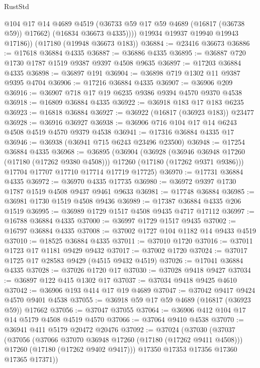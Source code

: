 \begin{lexlean}{RustStd}
\begin{coremodule}
              @104
              @17
              @14
              @4689
              @4519
              (@36733 @59 @17 @59 @4689 (@16817 (@36738 @59)) @17662)
              (@16834 @36673 @4335))))
        @19934
        @19937
        @19940
        @19943
        @17186))
    (@17180 (@19948 @36673 @183))
@36884 := @23416 @36673
@36886 := @17618 @36884 @4335
@36887 := @36886 @4335
@36895 := @36887 @720 @1730 @1787 @1519 @9387 @9397 @4508 @9635
@36897 := @17203 @36884 @4335
@36898 := @36897 @191
@36904 := @36898 @719 @1302 @11 @9387 @9395 @4704
@36906 := @17216 @36884 @4335
@36907 := @36906 @209
@36916 := @36907 @718 @17 @19 @6235 @9386 @9394 @4570 @9370 @4538
@36918 := @16809 @36884 @4335
@36922 := @36918 @183 @17 @183 @6235
@36923 := @16818 @36884
@36927 := @36922 (@16817 (@36923 @183)) @23477
@36928 := @36916 @36927
@36938 := @36906 @716 @104 @17 @14 @6243 @4508 @4519 @4570 @9379 @4538
@36941 := @17316 @36884 @4335 @17
@36946 := @36938 (@36941 @715 @6243 @23496 @23500)
@36948 := @17254 @36884 @4335
@36968 := @36895
    (@36904
      (@36928
        (@36946 @36948 @17260 (@17180 (@17262 @9380 @4508)))
        @17260
        (@17180 (@17262 @9371 @9386)))
      @17704
      @17707
      @17710
      @17714
      @17719
      @17725)
@36970 := @17731 @36884 @4335
@36972 := @36970 @4335 @17735
@36980 := @36972 @9397 @1730 @1787 @1519 @4508 @9437 @9461 @9633
@36981 := @17748 @36884
@36985 := @36981 @1730 @1519 @4508 @9436
@36989 := @17387 @36884 @4335 @206 @1519
@36995 := @36989 @1729 @1517 @4508 @9435 @4717 @17112
@36997 := @16788 @36884 @4335
@37000 := @36997 @1729 @1517 @9435
@37002 := @16797 @36884 @4335
@37008 := @37002 @1727 @104 @1182 @14 @9433 @4519
@37010 := @18525 @36884 @4335
@37011 := @37010 @1720
@37016 := @37011 @1723 @17 @1181 @9429 @9432
@37017 := @37002 @1720
@37024 := @37017 @1725 @17 @28583 @9429 (@4515 @9432 @4519)
@37026 := @17041 @36884 @4335
@37028 := @37026 @1720 @17
@37030 := @37028 @9418 @9427
@37034 := @36897 @122 @415 @1302 @17
@37037 := @37034 @9418 @9425 @4610
@37042 := @36906 @193 @414 @17 @19 @4689
@37047 := @37042 @9417 @9424 @4570 @9401 @4538
@37055 := @36918 @59 @17 @59 @4689 (@16817 (@36923 @59)) @17662
@37056 := @37047 @37055
@37064 := @36906 @412 @104 @17 @14 @5179 @4508 @4519 @4570
@37066 := @37064 @9410 @4538
@37070 := @36941 @411 @5179 @20472 @20476
@37092 := @37024
    (@37030
      (@37037
        (@37056
          (@37066 @37070 @36948 @17260 (@17180 (@17262 @9411 @4508)))
          @17260
          (@17180 (@17262 @9402 @9417)))
        @17350
        @17353
        @17356
        @17360
        @17365
        @17371))

\end{coremodule}
\end{lexlean}
